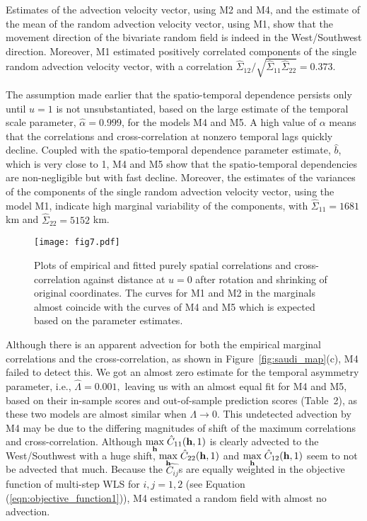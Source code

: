 \documentclass[12pt]{article}
\newcommand{\0}{\mathbf{0}}
\begin{document}
Estimates of the advection velocity vector, using M2 and M4, and the estimate of the mean of the random advection velocity vector, using M1, show that the movement direction of the bivariate random field is indeed in the West/Southwest direction. Moreover, M1 estimated positively correlated components of the single random advection velocity vector, with a correlation $\hat{\Sigma}_{12}/\sqrt{\hat{\Sigma}_{11}\hat{\Sigma}_{22}}=0.373$.

The assumption made earlier that the spatio-temporal dependence persists only until $u=1$ is not unsubstantiated, based on the large estimate of the temporal scale parameter, $\hat{\alpha}=0.999$, for the models M4 and M5. A high value of $\alpha$ means that the correlations and cross-correlation at nonzero temporal lags quickly decline. Coupled with the spatio-temporal dependence parameter estimate, $\hat{b}$, which is very close to 1, M4 and M5 show that the spatio-temporal dependencies are non-negligible but with fast decline. Moreover, the estimates of the variances of the components of the single random advection velocity vector, using the model M1, indicate high marginal variability of the components, with $\hat{\Sigma}_{11}=1681$ km and $\hat{\Sigma}_{22}=5152$ km.

\begin{figure}[t!]
 \centering
\texttt{[image: fig7.pdf]}
    \caption{\small Plots of empirical and fitted purely spatial correlations and cross-correlation against distance at $u=0$ after rotation and shrinking of original coordinates. The curves for M1 and M2 in the marginals almost coincide with the curves of M4 and M5 which is expected based on the parameter estimates. }
    \label{fig:empirical_plots_fit}
\end{figure}

Although there is an apparent advection for both the empirical marginal correlations and the cross-correlation, as shown in Figure~\ref{fig:saudi_map}(c), M4 failed to detect this. We got an almost zero estimate for the temporal asymmetry parameter, i.e., $\hat{\Lambda}=0.001,$ leaving us with an almost equal fit for M4 and M5, based on their in-sample scores and out-of-sample prediction scores (Table~2), as these two models are almost similar when $\Lambda\rightarrow 0$. This undetected advection by M4 may be due to the differing magnitudes of shift of the maximum correlations and cross-correlation. Although $\smash{\displaystyle\max_{\mathbf{h}}}\;\hat{C}_{11}(\mathbf{h},1)$ is clearly advected to the West/Southwest with a huge shift, $\smash{\displaystyle\max_{\mathbf{h}}}\;\hat{C}_{22}(\mathbf{h},1)$ and $\smash{\displaystyle\max_{\mathbf{h}}}\;\hat{C}_{12}(\mathbf{h},1)$ seem to not be advected that much. Because the $\hat{C_{ij}}$s are equally weighted in the objective function of multi-step WLS for $i,j=1,2$ (see Equation (\ref{eqn:objective_function1})), M4 estimated a random field with almost no advection.
\end{document}

